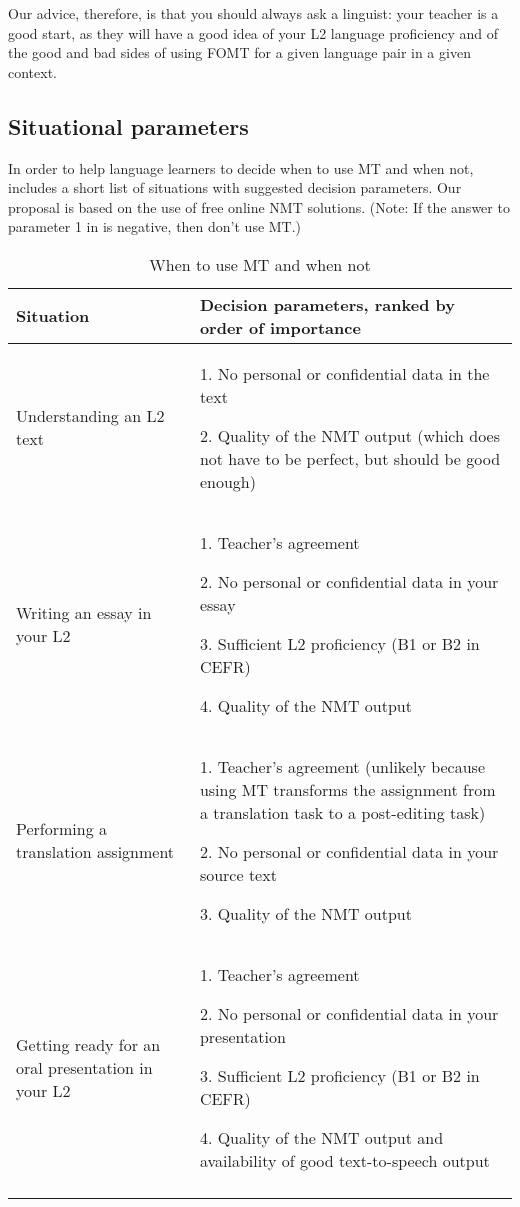 \documentclass[output=paper,colorlinks,citecolor=brown,
]{langscibook}
\begin{document}
Our advice, therefore, is that you should always ask a linguist: your teacher is a good start, as they will have a good idea of your L2 language proficiency and of the good and bad sides of using FOMT for a given language pair in a given context.

\subsection{Situational parameters}

In order to help language learners to decide when to use MT and when not,  includes a short list of situations with suggested decision parameters. Our proposal is based on the use of free online NMT solutions. (Note: If the answer to parameter 1 in  is negative, then don’t use MT.)


\begin{table}
\begin{tabularx}{\textwidth}{QQ}
\lsptoprule
{Situation} & {Decision parameters, ranked by order of importance}\\
\midrule
Understanding an L2 text & 1. No personal or confidential data in the text

2. Quality of the NMT output (which does not have to be perfect, but should be good enough)\\
\tablevspace

Writing an essay in your L2 & 1. Teacher’s agreement

2. No personal or confidential data in your essay

3. Sufficient L2 proficiency (B1 or B2 in CEFR)

4. Quality of the NMT output\\
\tablevspace
Performing a translation assignment & 1. Teacher’s agreement (unlikely because using MT transforms the assignment from a translation task to a post-editing task)

2. No personal or confidential data in your source text

3. Quality of the NMT output\\
\tablevspace

Getting ready for an oral presentation in your L2 & 1. Teacher’s agreement

2. No personal or confidential data in your presentation

3. Sufficient L2 proficiency (B1 or B2 in CEFR)

4. Quality of the NMT output and availability of good text-to-speech output\\
\lspbottomrule
\end{tabularx}
\caption{When to use MT and when not}
\label{tab:carre:1}
\end{table}
\end{document}
